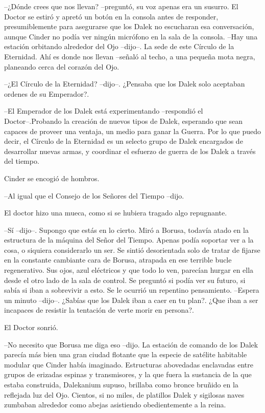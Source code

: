 --¿Dónde crees que nos llevan? --preguntó, su voz apenas era un susurro.
El Doctor se estiró y apretó un botón en la consola antes de responder, presumiblemente para asegurarse que los Dalek no escucharan esa conversación, aunque Cinder no podía ver ningún micrófono en la sala de la consola. 
--Hay una estación orbitando alrededor del Ojo --dijo--. La sede de este Círculo de la Eternidad. Ahí es donde nos llevan --señaló al techo, a una pequeña mota negra, planeando cerca del corazón del Ojo.

--¿El Círculo de la Eternidad? --dijo--. ¿Pensaba que los Dalek solo aceptaban ordenes de su Emperador?.

--El Emperador de los Dalek está experimentando --respondió el Doctor--.Probando la creación de nuevos tipos de Dalek, esperando que sean capaces de proveer una ventaja, un medio para ganar la Guerra. Por lo que puedo decir, el Círculo de la Eternidad es un selecto grupo de Dalek encargados de desarrollar nuevas armas, y coordinar el esfuerzo de guerra de los Dalek a través del tiempo.

Cinder se encogió de hombros. 

--Al igual que el Consejo de los Señores del Tiempo --dijo.

El doctor hizo una mueca, como si se hubiera tragado algo repugnante. 

--Sí --dijo--. Supongo que estás en lo cierto.
Miró a Borusa, todavía atado en la estructura de la máquina del Señor del Tiempo. Apenas podía soportar ver a la cosa, o siquiera considerarlo un ser. Se sintió desorientada solo de tratar de fijarse en la constante cambiante cara de Borusa, atrapada en ese terrible bucle regenerativo. Sus ojos, azul eléctricos y que todo lo ven, parecían hurgar en ella desde el otro lado de la sala de control. Se preguntó si podía ver su futuro, si sabía si iban a sobrevivir a esto. Se le ocurrió un repentino pensamiento. 
--Espera un minuto --dijo--. ¿Sabías que los Dalek iban a caer en tu plan?. ¿Que iban a ser incapaces de resistir la tentación de verte morir en persona?.

El Doctor sonrió. 

--No necesito que Borusa me diga eso --dijo.
La estación de comando de los Dalek parecía más bien una gran ciudad flotante que la especie de satélite habitable modular que Cinder había imaginado. Estructuras abovedadas enclavadas entre grupos de erizadas espinas y transmisores, y la que fuera la sustancia de la que estaba construida, Dalekanium supuso, brillaba como bronce bruñido en la reflejada luz del Ojo. Cientos, si no miles, de platillos Dalek y sigilosas naves zumbaban alrededor como abejas asistiendo obedientemente a la reina.

